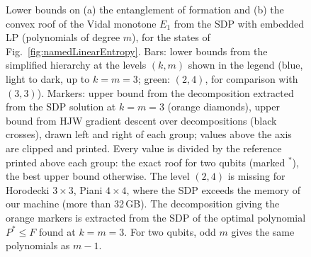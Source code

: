 \begin{figure}
  \caption{Lower bounds on (a) the entanglement of formation and (b) the convex roof of the Vidal monotone $E_1$ from
  the SDP with embedded LP (polynomials of degree $m$), for the states of Fig.~\ref{fig:namedLinearEntropy}.
  Bars: lower bounds from the simplified hierarchy at the levels $(k,m)$ shown in the legend (blue, light to dark, up to $k=m=3$; green: $(2,4)$, for comparison with $(3,3)$). Markers: upper bound from the decomposition extracted from the SDP solution at $k=m=3$ (orange diamonds), upper bound from HJW gradient descent over decompositions (black crosses), drawn left and right of each group; values above the axis are clipped and printed. Every value is divided by the reference printed above each group: the exact roof for two qubits (marked $^*$), the best upper bound otherwise. The level $(2,4)$ is missing for Horodecki $3\times3$, Piani $4\times4$, where the SDP exceeds the memory of our machine (more than 32\,GB). The decomposition giving the orange markers is extracted from the SDP of the optimal polynomial
  $P^*\leq F$ found at $k=m=3$. For two qubits, odd $m$ gives the same polynomials as $m-1$.}
  \label{fig:namedNonpolynomial}
\end{figure}

